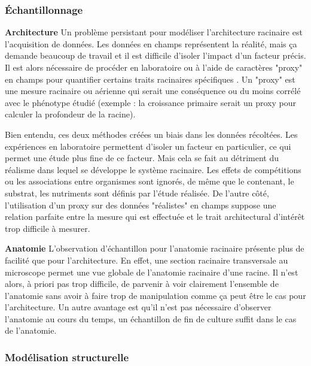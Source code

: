 \subsubsection{Échantillonnage}
\textbf{Architecture}
\newline
Un problème persistant pour modéliser l'architecture racinaire est l'acquisition de données.
Les données en champs représentent la réalité, mais ça demande beaucoup de travail et il est difficile d'isoler l'impact d'un facteur précis.
Il est alors nécessaire de procéder en laboratoire ou à l'aide de caractères "proxy" en champs pour quantifier certains traits racinaires spécifiques \citep{wasson_traits_2012}.
Un "proxy" est une mesure racinaire ou aérienne qui serait une conséquence ou du moins corrélé avec le phénotype étudié (exemple : la croissance primaire serait un proxy pour calculer la profondeur de la racine).
\newline

Bien entendu, ces deux méthodes créées un biais dans les données récoltées.
Les expériences en laboratoire permettent d'isoler un facteur en particulier, ce qui permet une étude plus fine de ce facteur.
Mais cela se fait au détriment du réalisme dans lequel se développe le système racinaire.
Les effets de compétitions ou les associations entre organismes sont ignorés, de même que le contenant, le substrat, les nutriments sont définis par l'étude réalisée.
De l'autre côté, l'utilisation d'un proxy sur des données "réalistes" en champs suppose une relation parfaite entre la mesure qui est effectuée et le trait architectural d'intérêt trop difficile à mesurer.
\newline

\textbf{Anatomie}
\newline
L'observation d'échantillon pour l'anatomie racinaire présente plus de facilité que pour l'architecture.
En effet, une section racinaire transversale au microscope permet une vue globale de l'anatomie racinaire d'une racine.
Il n'est alors, à priori pas trop difficile, de parvenir à voir clairement l'ensemble de l'anatomie sans avoir à faire trop de manipulation comme ça peut être le cas pour l'architecture.
Un autre avantage est qu'il n'est pas nécessaire d'observer l'anatomie au cours du temps, un échantillon de fin de culture suffit dans le cas de l'anatomie.

\subsubsection{Modélisation structurelle}

